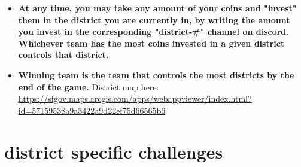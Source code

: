 \documentclass{article}
\begin{document}
\begin{itemize}
    \item \textbf{At any time, you may take any amount of your coins and "invest" them in the district you are currently in, by writing the amount you invest in the corresponding "district-\#" channel on discord. Whichever team has the most coins invested in a given district controls that district.}
    \item \textbf{Winning team is the team that controls the most districts by the end of the game.} District map here: \url{https://sfgov.maps.arcgis.com/apps/webappviewer/index.html?id=57159538a9a3422a9d22ef75d66565b6}
\end{itemize}

\section{district specific challenges}
\end{document}
